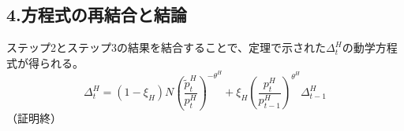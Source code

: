 \subsection*{4.方程式の再結合と結論}
\label{sec:appendix_dispersion_dynamics_sub4}
ステップ2とステップ3の結果を結合することで、定理で示された\(\Delta_t^H\)の動学方程式が得られる。
\begin{equation}
\Delta_t^H=(1-\xi_H)N\left(\frac{\tilde{p}_t^H}{p_t^H}\right)^{-\theta^H}+\xi_H\left(\frac{p_t^H}{p_{t-1}^H}\right)^{\theta^H}\Delta_{t-1}^H
\label{eq:appendix_dispersion_dynamics_sub4_final_form}
\end{equation}
（証明終）